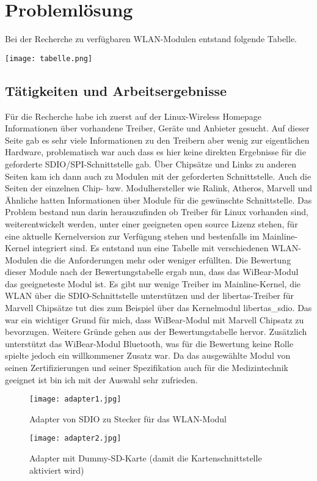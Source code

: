 \documentclass[pdftex,12pt,a4paper]{scrartcl}
\begin{document}
\section{Problemlösung}
Bei der Recherche zu verfügbaren WLAN-Modulen entstand folgende Tabelle.
\begin{center}
    \texttt{[image: tabelle.png]}
\end{center}
\subsection{Tätigkeiten und Arbeitsergebnisse}
Für die Recherche habe ich zuerst auf der Linux-Wireless Homepage Informationen über vorhandene Treiber, Geräte und Anbieter gesucht. Auf dieser Seite gab es sehr viele Informationen zu den Treibern aber wenig zur eigentlichen Hardware, problematisch war auch dass es hier keine direkten Ergebnisse für die geforderte SDIO/SPI-Schnittstelle gab. Über Chipsätze und Links zu anderen Seiten kam ich dann auch zu Modulen mit der geforderten Schnittstelle. Auch die Seiten der einzelnen Chip- bzw. Modulhersteller wie Ralink, Atheros, Marvell und Ähnliche hatten Informationen über Module für die gewünschte Schnittstelle. Das Problem bestand nun darin herauszufinden ob Treiber für Linux vorhanden sind, weiterentwickelt werden, unter einer geeigneten open source Lizenz stehen, für eine aktuelle Kernelversion zur Verfügung stehen und bestenfalls im Mainline-Kernel integriert sind. Es entstand nun eine Tabelle mit verschiedenen WLAN-Modulen die die Anforderungen mehr oder weniger erfüllten. Die Bewertung dieser Module nach der Bewertungstabelle ergab nun, dass das WiBear-Modul das geeigneteste Modul ist.
Es gibt nur wenige Treiber im Mainline-Kernel, die WLAN über die SDIO-Schnittstelle unterstützen und der libertas-Treiber für Marvell Chipsätze tut dies zum Beispiel über das Kernelmodul libertas\_sdio. Das war ein wichtiger Grund für mich, dass WiBear-Modul mit Marvell Chipsatz zu bevorzugen. Weitere Gründe gehen aus der Bewertungstabelle hervor. Zusätzlich unterstützt das WiBear-Modul Bluetooth, was für die Bewertung keine Rolle spielte jedoch ein willkommener Zusatz war. Da das ausgewählte Modul von seinen Zertifizierungen und seiner Spezifikation auch für die Medizintechnik geeignet ist bin ich mit der Auswahl sehr zufrieden.
\begin{figure}[H] %
    \centering
    \texttt{[image: adapter1.jpg]}
    \caption{Adapter von SDIO zu Stecker für das WLAN-Modul}
\end{figure}
\begin{figure}[H] %
    \centering
    \texttt{[image: adapter2.jpg]}
    \caption{Adapter mit Dummy-SD-Karte (damit die Kartenschnittstelle aktiviert wird)}
\end{figure}
\end{document}
